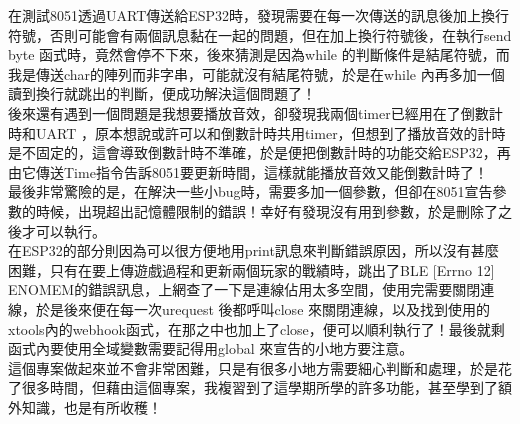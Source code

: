 \documentclass{scrartcl}
\begin{document}
在測試8051透過UART傳送給ESP32時，發現需要在每一次傳送的訊息後加上換行符號，否則可能會有兩個訊息黏在一起的問題，但在加上換行符號後，在執行send byte 函式時，竟然會停不下來，後來猜測是因為while 的判斷條件是結尾符號，而我是傳送char的陣列而非字串，可能就沒有結尾符號，於是在while 內再多加一個讀到換行就跳出的判斷，便成功解決這個問題了！\\

後來還有遇到一個問題是我想要播放音效，卻發現我兩個timer已經用在了倒數計時和UART ，原本想說或許可以和倒數計時共用timer，但想到了播放音效的計時是不固定的，這會導致倒數計時不準確，於是便把倒數計時的功能交給ESP32，再由它傳送Time指令告訴8051要更新時間，這樣就能播放音效又能倒數計時了！\\

最後非常驚險的是，在解決一些小bug時，需要多加一個參數，但卻在8051宣告參數的時候，出現超出記憶體限制的錯誤！幸好有發現沒有用到參數，於是刪除了之後才可以執行。\\

在ESP32的部分則因為可以很方便地用print訊息來判斷錯誤原因，所以沒有甚麼困難，只有在要上傳遊戲過程和更新兩個玩家的戰績時，跳出了BLE [Errno 12] ENOMEM的錯誤訊息，上網查了一下是連線佔用太多空間，使用完需要關閉連線，於是後來便在每一次urequest 後都呼叫close 來關閉連線，以及找到使用的xtools內的webhook函式，在那之中也加上了close，便可以順利執行了！最後就剩函式內要使用全域變數需要記得用global 來宣告的小地方要注意。\\

這個專案做起來並不會非常困難，只是有很多小地方需要細心判斷和處理，於是花了很多時間，但藉由這個專案，我複習到了這學期所學的許多功能，甚至學到了額外知識，也是有所收穫！
\end{document}
